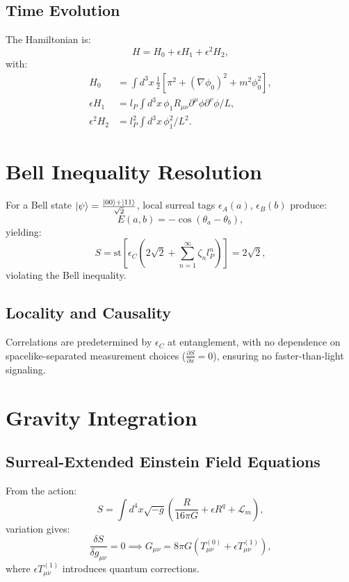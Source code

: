 \documentclass{article}
\begin{document}
\subsection{Time Evolution}
The Hamiltonian is:
\begin{equation}
H = H_0 + \epsilon H_1 + \epsilon^2 H_2,
\end{equation}
with:
\begin{align}
H_0 &= \int d^3x \, \frac{1}{2} [\pi^2 + (\nabla \phi_0)^2 + m^2 \phi_0^2], \\
\epsilon H_1 &= l_P \int d^3x \, \phi_1 R_{\mu\nu} \partial^\mu \phi \partial^\nu \phi / L, \\
\epsilon^2 H_2 &= l_P^2 \int d^3x \, \phi_1^2 / L^2.
\end{align}

\section{Bell Inequality Resolution}
For a Bell state \(\ket{\psi} = \frac{\ket{00} + \ket{11}}{\sqrt{2}}\), local surreal tags \(\epsilon_A(a)\), \(\epsilon_B(b)\) produce:
\begin{equation}
E(a,b) = -\cos(\theta_a - \theta_b),
\end{equation}
yielding:
\begin{equation}
S = \text{st}\left[ \epsilon_C \left(2\sqrt{2} + \sum_{n=1}^\infty \zeta_n l_P^n\right) \right] = 2\sqrt{2},
\end{equation}
violating the Bell inequality.

\subsection{Locality and Causality}
Correlations are predetermined by \(\epsilon_C\) at entanglement, with no dependence on spacelike-separated measurement choices (\(\frac{\partial S}{\partial x} = 0\)), ensuring no faster-than-light signaling.

\section{Gravity Integration}
\subsection{Surreal-Extended Einstein Field Equations}
From the action:
\begin{equation}
S = \int d^4x \sqrt{-g} \left( \frac{R}{16\pi G} + \epsilon R^q + \mathcal{L}_m \right),
\end{equation}
variation gives:
\begin{equation}
\frac{\delta S}{\delta g_{\mu\nu}} = 0 \implies G_{\mu\nu} = 8\pi G \left( T_{\mu\nu}^{(0)} + \epsilon T_{\mu\nu}^{(1)} \right),
\end{equation}
where \(\epsilon T_{\mu\nu}^{(1)}\) introduces quantum corrections.
\end{document}
